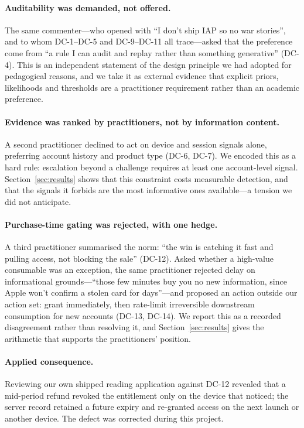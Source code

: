 \documentclass{article}
\begin{document}
\paragraph{Auditability was demanded, not offered.} The same commenter---who opened with ``I don't ship IAP so no war stories'', and to whom DC-1--DC-5 and DC-9--DC-11 all trace---asked that the
preference come from ``a rule I can audit and replay rather than something generative''
(DC-4). This is an independent statement of the design principle we had adopted for
pedagogical reasons, and we take it as external evidence that explicit priors, likelihoods
and thresholds are a practitioner requirement rather than an academic preference.

\paragraph{Evidence was ranked by practitioners, not by information content.} A second
practitioner declined to act on device and session signals alone, preferring account
history and product type (DC-6, DC-7). We encoded this as a hard rule: escalation beyond a
challenge requires at least one account-level signal. Section~\ref{sec:results} shows that
this constraint costs measurable detection, and that the signals it forbids are the most
informative ones available---a tension we did not anticipate.

\paragraph{Purchase-time gating was rejected, with one hedge.} A third practitioner summarised
the norm: ``the win is catching it fast and pulling access, not blocking the sale''
(DC-12). Asked whether a high-value consumable was an exception, the same practitioner
rejected delay on informational grounds---``those few minutes buy you no new information,
since Apple won't confirm a stolen card for days''---and proposed an action outside our
action set: grant immediately, then rate-limit irreversible downstream consumption for new
accounts (DC-13, DC-14). We report this as a recorded disagreement rather than resolving
it, and Section~\ref{sec:results} gives the arithmetic that supports the practitioners'
position.

\paragraph{Applied consequence.} Reviewing our own shipped reading application against
DC-12 revealed that a mid-period refund revoked the entitlement only on the device that
noticed; the server record retained a future expiry and re-granted access on the next
launch or another device. The defect was corrected during this project.
\end{document}
